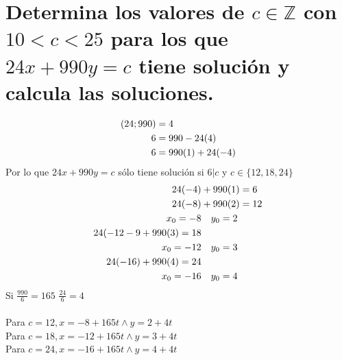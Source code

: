 \section{Determina los valores de $c \in \mathbb{Z}$ con $10 < c < 25$ para los que $24x + 990y = c$ tiene solución y calcula las soluciones.}
    \begin{align}
        \notag (24;990) &= 4 \\
        \notag 6 &= 990-24(4) \\
        \notag 6 &= 990(1) +24(-4)
    \end{align}
    Por lo que $24x+990y = c$ sólo tiene solución si $6|c$ y $c \in \{12,18,24\}$
    \begin{align}
        \notag 24(-4) &+ 990(1) = 6 \\
        \notag 24(-8) &+ 990(2) = 12 \\
        \notag x_0 = -8 &\quad y_0 = 2 \\
        \notag 24(-12-9+990(3) = 18 \\
        \notag x_0 = -12 &\quad y_0 = 3 \\
        \notag 24(-16) + 990(4) = 24 \\
        \notag x_0 = -16 &\quad y_0 = 4 \\
    \end{align}
    Si $\frac{990}{6} = 165$ \qquad $\frac{24}{6} = 4$ \\ \\
    Para $c = 12, x = -8 + 165t \wedge y =2+4t$ \\
    Para $c = 18, x = -12 + 165t \wedge y =3+4t$ \\
    Para $c = 24, x = -16 + 165t \wedge y =4+4t$ \\